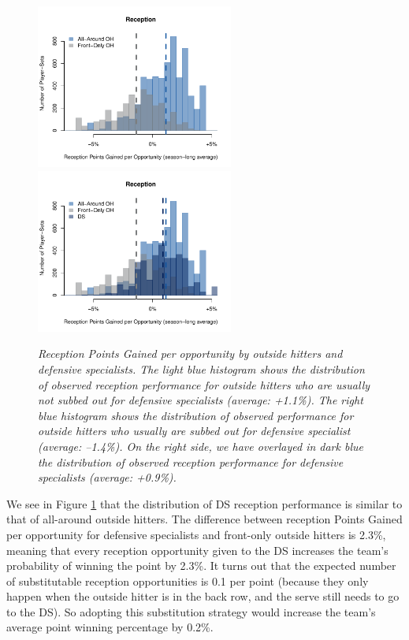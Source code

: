 \documentclass{article}
\begin{document}
\begin{figure}
    \centering
    \includegraphics[height=5.4cm]{figures/oh_comparison.pdf}
    \includegraphics[height=5.4cm]{figures/oh_comparison_with_ds.pdf}
    \caption{\it Reception Points Gained per opportunity by outside hitters and defensive specialists. The light blue histogram shows the distribution of observed reception performance for outside hitters who are usually not subbed out for defensive specialists (average: +1.1\%). The right blue histogram shows the distribution of observed performance for outside hitters who usually are subbed out for defensive specialist (average: --1.4\%). On the right side, we have overlayed in dark blue the distribution of observed reception performance for defensive specialists (average: +0.9\%).}
    \label{fig:oh-comparison}
\end{figure}

We see in Figure \ref{fig:oh-comparison} that the distribution of DS reception performance is similar to that of all-around outside hitters. The difference between reception Points Gained per opportunity for defensive specialists and front-only outside hitters is 2.3\%, meaning that every reception opportunity given to the DS increases the team's probability of winning the point by 2.3\%. It turns out that the expected number of substitutable reception opportunities is 0.1 per point (because they only happen when the outside hitter is in the back row, and the serve still needs to go to the DS). So adopting this substitution strategy would increase the team's average point winning percentage by 0.2\%.
\end{document}
